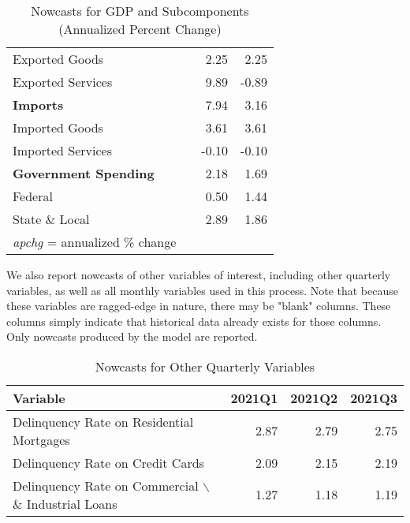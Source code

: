 \documentclass[11pt, letterpaper]{article}\usepackage[]{graphicx}\usepackage[]{color}
\begin{document}
\begin{table}[H]
\begin{tabular}{lrrr}
  \hspace{8mm}  Exported Goods &  & 2.25 & 2.25 \\ 
  \hspace{8mm}  Exported Services &  & 9.89 & -0.89 \\ 
  \hspace{0mm} \textbf{Imports} &  & 7.94 & 3.16 \\ 
  \hspace{8mm}  Imported Goods &  & 3.61 & 3.61 \\ 
  \hspace{8mm}  Imported Services &  & -0.10 & -0.10 \\ 
  \hspace{0mm} \textbf{Government Spending} &  & 2.18 & 1.69 \\ 
  \hspace{8mm}  Federal &  & 0.50 & 1.44 \\ 
  \hspace{8mm}  State \& Local &  & 2.89 & 1.86 \\ 
   \hline 
 \textit{apchg} = annualized \% change 
\end{tabular}
\endgroup
\caption{Nowcasts for GDP and Subcomponents (Annualized Percent Change)} 
\end{table}


We also report nowcasts of other variables of interest, including other quarterly variables, as well as all monthly variables used in this process. Note that because these variables are ragged-edge in nature, there may be "blank" columns. These columns simply indicate that historical data already exists for those columns. Only nowcasts produced by the model are reported.
\begin{table}[H]
\centering
\begingroup\fontsize{11pt}{13pt}\selectfont
\begin{tabular}{lrrr}
  \hline
Variable & 2021Q1 & 2021Q2 & 2021Q3 \\ 
  \hline
Delinquency Rate on Residential Mortgages & 2.87 & 2.79 & 2.75 \\ 
  Delinquency Rate on Credit Cards & 2.09 & 2.15 & 2.19 \\ 
  Delinquency Rate on Commercial $\backslash$\& Industrial Loans & 1.27 & 1.18 & 1.19 \\ 
   \hline
\end{tabular}
\endgroup
\caption{Nowcasts for Other Quarterly Variables} 
\end{table}
\end{document}
